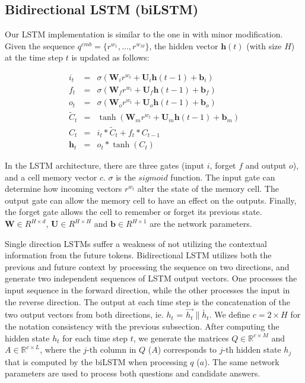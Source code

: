\documentclass{article}
\begin{document}
\subsection{Bidirectional LSTM (biLSTM)}
Our LSTM implementation is similar to the one in \cite{graves2013} with minor modification. Given the sequence $q^{emb}=\{r^{w_{1}}, ..., r^{w_{M}}\}$, 
the hidden vector $\mathbf{h}(t)$ (with size $H$) at the time step $t$ is updated as follows:  

\begin{eqnarray}
i_{t} & = & \sigma(\mathbf{W}_{i}r^{w_{t}}+\mathbf{U}_{i}\mathbf{h}(t-1)+\mathbf{b}_{i})\\
f_{t} & = & \sigma(\mathbf{W}_{f}r^{w_{t}}+\mathbf{U}_{f}\mathbf{h}(t-1)+\mathbf{b}_{f})\\
o_{t} & = & \sigma(\mathbf{W}_{o}r^{w_{t}}+\mathbf{U}_{o}\mathbf{h}(t-1)+\mathbf{b}_{o})\\
\tilde{C}_{t} & = & \tanh(\mathbf{W}_{m}r^{w_{t}}+\mathbf{U}_{m}\mathbf{h}(t-1)+\mathbf{b}_{m})\\
C_{t} & = & i_{t}*\tilde{C}_{t}+f_{t}*C_{t-1}\\
\mathbf{h}_{t} & = & o_{t}*\tanh(C_{t})
\end{eqnarray}

In the LSTM architecture, there are three gates
(input $i$, forget $f$ and output $o$), and a cell memory vector $c$. 
$\sigma$ is the $sigmoid$ function. The input gate can determine how incoming vectors $r^{w_{t}}$ alter the state of the memory cell. The output gate can allow the memory cell to have an effect on the outputs. Finally, the forget gate allows the cell to remember or forget its previous state.
$\mathbf{W} \in R^{H \times d}$, $\mathbf{U} \in R^{H \times H}$ and $\mathbf{b} \in R^{H \times 1}$ are the network parameters. 

Single direction LSTMs suffer a weakness of not utilizing the contextual information from the future tokens. Bidirectional LSTM utilizes both the previous and future context by processing the sequence on two directions, and generate two independent sequences of LSTM output vectors. One processes the input sequence in the forward direction, while
the other processes the input in the reverse direction.
The output at each time step is the concatenation of the two output vectors from both directions, ie. $h_t$ = $\overrightarrow{h_{t}} \parallel \overleftarrow{h_{t}}$.
We define $c=2 \times H$ for the notation consistency with the previous subsection.
After computing the hidden state $h_t$ for each time step $t$, we generate the matrices  $Q \in \mathbb{R}^{c \times M}$ and  $A \in \mathbb{R}^{c \times L}$,
where the $j$-th column in $Q$ ($A$) corresponds to $j$-th hidden state $h_j$ that is computed by the biLSTM when processing $q$ ($a$). 
The same network parameters are used to process both questions and candidate answers. 
\end{document}
